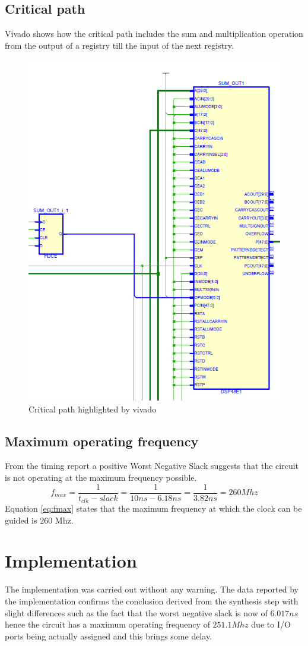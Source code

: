 \subsection{Critical path} %
\label{sub:critical_path}
Vivado shows how the critical path includes the sum and multiplication operation from the output of a registry till the input of the next registry.
 \begin{figure}[H]
   \centering
   \includegraphics[width=0.5\linewidth]{./images/critical}
   \caption{Critical path highlighted by vivado}
   \label{fig:critical}
 \end{figure}
\subsection{Maximum operating frequency} %
\label{sub:maximum_operating_frequency}
From the timing report a positive Worst Negative Slack suggests that the circuit is not operating at the maximum frequency possible.
\begin{equation}
	\label{eq:fmax}
	f_{max} = \frac{1}{t_{clk}-slack}=\frac{1}{10ns-6.18ns}= \frac{1}{3.82ns}= 260 Mhz
\end{equation}
Equation \ref{eq:fmax} states that the maximum frequency at which the clock can be guided is 260 Mhz.

\section{Implementation}
The implementation was carried out without any warning. The data reported by the implementation confirms the conclusion derived from the synthesis step with slight differences such as the fact that the worst negative slack is now of $6.017ns$ hence the circuit has a maximum operating frequency of $251.1Mhz$ due to I/O ports being actually assigned and this brings some delay. 

